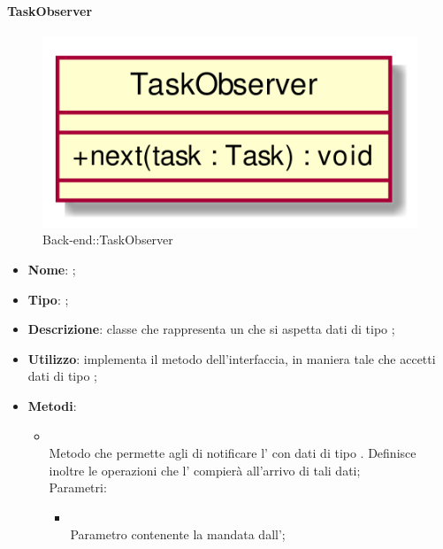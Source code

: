 \hypertarget{TaskObserver_label}{\paragraph{TaskObserver}}
\begin{figure}[h]
	\centering
	\includegraphics[width=\textwidth,height=\textheight,keepaspectratio]{images/ClassTaskObserver.png}
	\caption{Back-end::TaskObserver}
\end{figure}
\begin{itemize}
	\item \textbf{Nome}: ;
	\item \textbf{Tipo}: ;
	\item \textbf{Descrizione}: classe che rappresenta un  che si aspetta dati di tipo ;
	\item \textbf{Utilizzo}: implementa il metodo  dell'interfaccia, in maniera tale che accetti dati di tipo ;
	\item \textbf{Metodi}:
	\begin{itemize}
		\item[]  \\
		Metodo che permette agli  di notificare l' con dati di tipo . Definisce inoltre le operazioni che l' compierà all'arrivo di tali dati;\\
		Parametri:
		\begin{itemize}
			\item {} \\
			Parametro contenente la  mandata dall';
		\end{itemize}
	\end{itemize}
\end{itemize}


